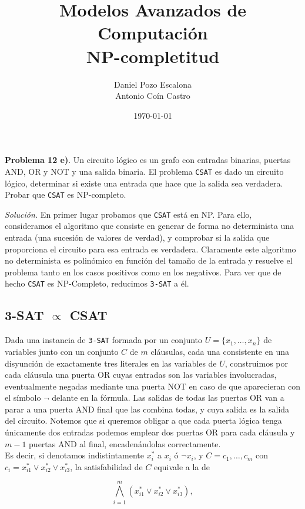 \documentclass[11pt,a4paper]{article}
\title{Modelos Avanzados de Computación \\ \Large{NP-completitud}}
\author{Daniel Pozo Escalona \\ Antonio Coín Castro}
\date{\today}
\newenvironment{sol}{\begin{adjustwidth}{1em}{}}{\end{adjustwidth}}
\begin{document}
\maketitle

\textbf{Problema 12 e)}. Un circuito lógico es un grafo con entradas binarias, puertas AND, OR y NOT y una salida binaria. El problema \verb|CSAT| es dado un circuito lógico, determinar si existe una entrada
que hace que la salida sea verdadera. Probar que \verb|CSAT| es NP-completo.\\

\begin{sol} \textit{Solución.} En primer lugar probamos que \verb|CSAT| está en NP. Para ello, consideramos el algoritmo que consiste en generar de forma no determinista una entrada (una sucesión de valores de verdad), y comprobar si la salida que proporciona el circuito para esa entrada es verdadera. Claramente este algoritmo no determinista es polinómico en función del tamaño de la entrada y resuelve el problema tanto en los casos positivos como en los negativos. Para ver que de hecho \verb|CSAT| es NP-Completo, reducimos \verb|3-SAT| a él.

\subsection*{3-SAT $\mathbf{\propto}$ CSAT}

Dada una instancia de \verb|3-SAT| formada por un conjunto $U=\{x_1, \dots, x_n\}$ de variables junto con un conjunto $C$ de $m$ cláusulas, cada una consistente en una disyunción de exactamente tres literales en las variables de $U$, construimos por cada cláusula una puerta OR cuyas entradas son las variables involucradas, eventualmente negadas mediante una puerta NOT en caso de que aparecieran con el símbolo $\lnot$ delante en la fórmula. Las salidas de todas las puertas OR van a parar a una puerta AND final que las combina todas, y cuya salida es la salida del circuito. Notemos que si queremos obligar a que cada puerta lógica tenga únicamente dos entradas podemos emplear dos puertas OR para cada cláusula y $m-1$ puertas AND al final, encadenándolas correctamente.\\

Es decir, si denotamos indistintamente $x^*_i$ a $x_i$ ó $\lnot x_i$, y $C = { c_1, \dots, c_m}$ con $c_i = x^*_{i1} \lor x^*_{i2}\lor x^*_{i3}$, la satisfabilidad de $C$ equivale a la de

\[
\bigwedge_{i=1}^m (x^*_{i1} \lor x^*_{i2} \lor x^*_{i3}),
\]


\end{sol}
\end{document}
